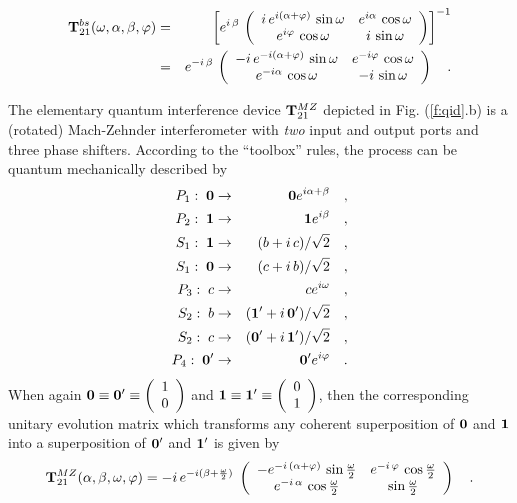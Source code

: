 \documentclass [11pt]{llncs}
\begin{document}
\begin{eqnarray}
{\bf T}_{21}^{bs} (\omega ,\alpha ,\beta ,\varphi )&=&
\left[
e^{i\, \beta }\,
\left(
\begin{array}{cc}
i \, e^{i(\alpha +\varphi)} \,  \sin \omega  &e^{i\alpha }\,
  \cos \omega
\\ e^{i\varphi }\, \cos \omega  & i\,\sin \omega
 \end{array}
\right)
\right]^{-1}
\nonumber \\
&=&
e^{-i\, \beta }\,
\left(
\begin{array}{cc}
-i \, e^{-i(\alpha +\varphi)} \,  \sin \omega  &e^{-i\varphi }\,
  \cos \omega
\\ e^{-i\alpha }\, \cos \omega  & -i\,\sin \omega
 \end{array}
\right)
 \quad .
\label{e:quid1}
\end{eqnarray}


The
elementary quantum interference device ${\bf T}_{21}^{MZ}$ depicted in
Fig.
(\ref{f:qid}.b)
is a (rotated) Mach-Zehnder interferometer with {\em two}
input and output ports and three phase shifters.
According to the ``toolbox'' rules, the process can
be quantum mechanically described by
\begin{eqnarray}
P_1:\; {\bf 0}  &\rightarrow&  {\bf 0} e^{i
\alpha +\beta}
\quad , \\
P_2:\; {\bf 1}  &\rightarrow&  {\bf 1} e^{i
\beta}
\quad , \\
S_1:\; {\bf 1}  &\rightarrow& ( b  +i\,
c )/\sqrt{2}
\quad , \\
S_1:\; {\bf 0}  &\rightarrow& ( c  +i\,
b )/\sqrt{2}
\quad , \\
P_3:\; c  &\rightarrow&  c e^{i \omega
}\quad ,\\
S_2:\; b  &\rightarrow& ( {\bf 1}'  + i\,
{\bf 0}' )/\sqrt{2}\quad ,\\
S_2:\; c  &\rightarrow& ( {\bf 0}'  + i\,
{\bf 1}' )/\sqrt{2}\quad ,\\
P_4:\; {\bf 0}'  &\rightarrow&  {\bf 0}' e^{i
\varphi
}\quad .
\end{eqnarray}
When again
$ {\bf 0} \equiv   {\bf 0}' \equiv
\left(
\begin{array}{c}
1 \\
0
 \end{array}
\right)
$
and
$ {\bf 1} \equiv  {\bf 1}' \equiv
\left(
\begin{array}{c}
0 \\
1
 \end{array}
\right)
$, then
the corresponding unitary evolution matrix
which transforms any coherent superposition of $ {\bf 0} $
and $ {\bf 1} $
into a superposition of
$ {\bf 0}' $
and
$ {\bf 1}' $
 is given by
\begin{equation}
{\bf T}_{21}^{MZ} (\alpha ,\beta ,\omega ,\varphi )=
-i\,e^{-i(\beta +{\omega \over 2})}\;\left(
\begin{array}{cc}
-{e^{-i\,({\alpha +\varphi })}}\,\sin {{\omega }\over 2}
&
   {e^{-i\,{\varphi}}}\,\cos {{\omega }\over 2} \\
  e^{-i\,{\alpha }}\,\cos {{\omega }\over 2}&\sin {{\omega }\over
2}
 \end{array}
\right)
 \quad .
\label{e:quid2}
\end{equation}
\end{document}
